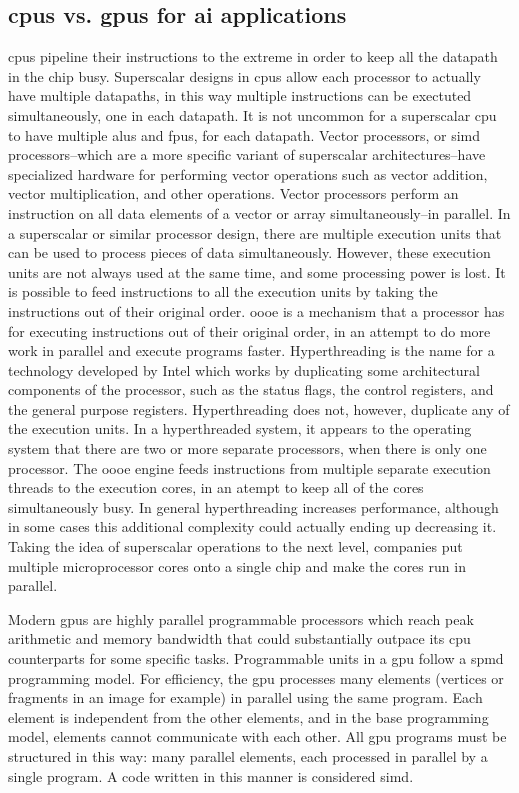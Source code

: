 \documentclass[11pt,a4paper]{article}
\begin{document}
\subsection{\glspl{cpu} vs. \glspl{gpu} for \gls{ai} applications}

\glspl{cpu} pipeline their instructions to the extreme in order to keep all the datapath in the chip busy. Superscalar designs in \glspl{cpu} allow each processor to actually have multiple datapaths, in this way multiple instructions can be exectuted simultaneously, one in each datapath. It is not uncommon for a superscalar \gls{cpu} to have multiple \glspl{alu} and \glspl{fpu}, for each datapath. Vector processors, or \gls{simd} processors--which are a more specific variant of superscalar architectures--have specialized hardware for performing vector operations such as vector addition, vector multiplication, and other operations. Vector processors perform an instruction on all data elements of a vector or  array simultaneously--in parallel. In a superscalar or similar processor design, there are multiple execution units that can be used to process pieces of data simultaneously. However, these execution units are not always used at the same time, and some processing power is lost. It is possible to feed instructions to all the execution units by taking the instructions out of their original order. \gls{oooe} is a mechanism that a processor has for executing instructions out of their original order, in an attempt to do more work in parallel and execute programs faster. Hyperthreading is the name for a technology developed by Intel which works by duplicating some architectural components of the processor, such as the status flags, the control registers, and the general purpose registers. Hyperthreading does not, however, duplicate any of the execution units. In a hyperthreaded system, it appears to the operating system that there are two or more separate processors, when there is only one processor. The \gls{oooe} engine feeds instructions from multiple separate execution threads to the execution cores, in an atempt to keep all of the cores simultaneously busy. In general hyperthreading increases performance, although in some cases this additional complexity could actually ending up decreasing it. Taking the idea of superscalar operations to the next level, companies put multiple microprocessor cores onto a single chip and make the cores run in parallel.

Modern \glspl{gpu} are highly parallel programmable processors which reach peak arithmetic and memory bandwidth that could substantially outpace its \gls{cpu} counterparts for some specific tasks. Programmable units in a \gls{gpu} follow a \gls{spmd} programming model. For efficiency, the \gls{gpu} processes many elements (vertices or fragments in an image for example) in parallel using the same program. Each element is independent from the other elements, and in the base programming model, elements cannot communicate with each other. All \gls{gpu} programs must be structured in this way: many parallel elements, each processed in parallel by a single program. A code written in this manner is considered \gls{simd}.
\end{document}
